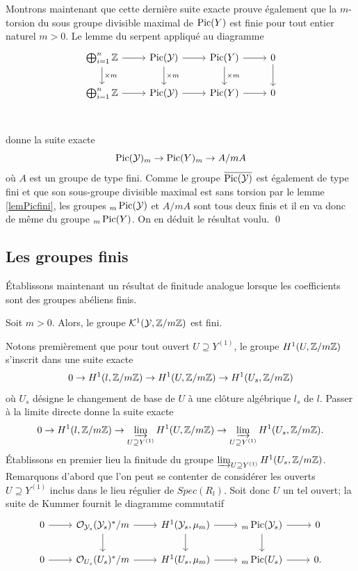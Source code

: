 \documentclass[11pt]{article}
\begin{document}
Montrons maintenant que cette dernière suite exacte prouve également que la $m$-torsion du sous groupe divisible maximal de $\operatorname{Pic}(Y)$ est finie pour tout entier naturel $m>0$. 
Le lemme du serpent appliqué au diagramme
\[\begin{tikzcd}
   \bigoplus_{i=1}^n \Z  & \Pic(\CY) & \Pic(Y) & 0 \\
   \bigoplus_{i=1}^n \Z  & \Pic(\CY) & \Pic(Y) & 0\\
    \arrow[from=1-1, to=2-1, "\times m"]
	\arrow[from=1-1, to=1-2]
    \arrow[from=1-2, to=1-3]
    \arrow[from=1-3, to=1-4]
	\arrow[from=2-1, to=2-2]
    \arrow[from=2-2, to=2-3]
    \arrow[from=2-3, to=2-4]
    \arrow[from=1-2, to=2-2, "\times m"]
    \arrow[from=1-3, to=2-3, "\times m"]
    \arrow[from=1-4, to=2-4]
\end{tikzcd}\]
donne la suite exacte
$$
 \operatorname{Pic}(\mathcal{Y})_m \rightarrow \operatorname{Pic}(Y)_m \rightarrow A/mA
$$
où $A$ est un groupe de type fini. Comme le groupe $\overline{\operatorname{Pic}(\mathcal{Y})}$ est également de type fini et que son sous-groupe divisible maximal est sans torsion par le lemme \ref{lemPicfini}, les groupes ${}_{m}\operatorname{Pic}(\mathcal{Y})$ et $A/mA$ sont tous deux finis et il en va donc de même du groupe ${}_{m}\operatorname{Pic}(Y)$. On en déduit le résultat voulu. \qed

\subsection{Les groupes finis}
Établissons maintenant un résultat de finitude analogue lorsque les coefficients sont des groupes abéliens finis.

\begin{prop}\label{propdéployéfinitude}
    Soit $m > 0$. Alors, le groupe $\mathcal{K}^1(\mathcal{Y}, \mathbb{Z} / m\mathbb{Z})$ est fini.
\end{prop}

\proof
Notons premièrement que pour tout ouvert $U \supseteq Y^{(1)}$, le groupe $H^1(U, \mathbb{Z} / m\mathbb{Z})$ s'inscrit dans une suite exacte
$$
0 \rightarrow H^1(l,\mathbb{Z} / m\mathbb{Z}) \rightarrow H^1(U, \mathbb{Z} / m\mathbb{Z}) \rightarrow H^1(U_s, \mathbb{Z} / m\mathbb{Z})
$$
où $U_s$ désigne le changement de base de $U$ à une clôture algébrique $l_s$ de $l$. Passer à la limite directe donne la suite exacte
$$
0 \rightarrow H^1(l,\mathbb{Z} / m\mathbb{Z}) \rightarrow \varinjlim_{U \supseteq Y^{(1)}} H^1(U, \mathbb{Z} / m\mathbb{Z}) \rightarrow \varinjlim_{U \supseteq Y^{(1)}} H^1(U_s, \mathbb{Z} / m\mathbb{Z}).
$$
Établissons en premier lieu la finitude du groupe $\varinjlim_{U \supseteq Y^{(1)}} H^1(U_s, \mathbb{Z} / m\mathbb{Z})$. Remarquons d'abord que l'on peut se contenter de considérer les ouverts $U \supseteq Y^{(1)}$ inclus dans le lieu régulier de $Spec(R_l)$. Soit donc $U$ un tel ouvert; la suite de Kummer fournit le diagramme commutatif
\[\begin{tikzcd}
   0 & \CO_{\CY_s}(\CY_s)^*/m & H^1(\CY_s, \mu_m) & {}_{m}\Pic(\CY_s) & 0 \\
	0 & \CO_{U_s}(U_s)^*/m & H^1(U_s, \mu_m) & {}_{m}\Pic(U_s) & 0.\\
	\arrow[from=1-1, to=1-2]
    \arrow[from=1-2, to=1-3]
    \arrow[from=1-3, to=1-4]
    \arrow[from=1-4, to=1-5]
	\arrow[from=2-1, to=2-2]
    \arrow[from=2-2, to=2-3]
    \arrow[from=2-3, to=2-4]
    \arrow[from=2-4, to=2-5]
    \arrow[from=1-2, to=2-2]
    \arrow[from=1-3, to=2-3]
    \arrow[from=1-4, to=2-4]
\end{tikzcd}\]
\end{document}
